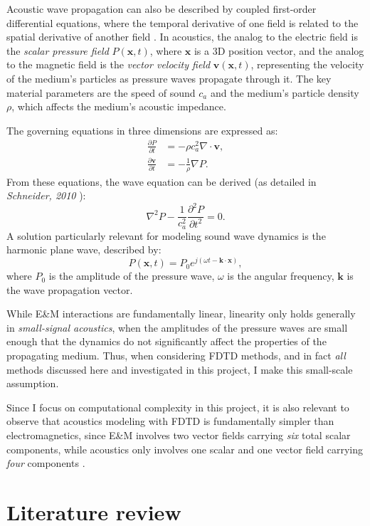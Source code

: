 \documentclass[12pt]{article}
\newcommand{\vct}[1]{\mathbf{#1}}
\begin{document}
Acoustic wave propagation can also be described by coupled first-order differential equations, where the temporal derivative of one field is related to the spatial derivative of another field \cite{schneider_fdtd_2010}.
In acoustics, the analog to the electric field is the \textit{scalar pressure field} $P(\vct{x}, t)$, where $\vct{x}$ is a 3D position vector, and the analog to the magnetic field is the \textit{vector velocity field} $\mathbf{v}(\vct{x}, t)$, representing the velocity of the medium's particles as pressure waves propagate through it.
The key material parameters are the speed of sound $c_a$ and the medium's particle density $\rho$, which affects the medium's acoustic impedance.

The governing equations in three dimensions are expressed as:
\begin{align}
\frac{\partial P}{\partial t} &= -\rho c_a^2 \nabla \cdot \mathbf{v},\\
\frac{\partial \mathbf{v}}{\partial t} &= -\frac{1}{\rho}\nabla P.
\end{align}
From these equations, the wave equation can be derived (as detailed in \textit{Schneider, 2010} \cite{schneider_fdtd_2010}):
$$\nabla^2P - \frac{1}{c_a^2}\frac{\partial^2 P}{\partial t^2} = 0.$$
A solution particularly relevant for modeling sound wave dynamics is the harmonic plane wave, described by:
$$P(\vct{x},t) = P_0 e^{j(\omega t - \vct{k} \cdot \vct{x})},$$
where $P_0$ is the amplitude of the pressure wave, $\omega$ is the angular frequency, $\vct{k}$ is the wave propagation vector.

While E\&M interactions are fundamentally linear, linearity only holds generally in \textit{small-signal acoustics}, when the amplitudes of the pressure waves are small enough that the dynamics do not significantly affect the properties of the propagating medium.
Thus, when considering FDTD methods, and in fact \textit{all} methods discussed here and investigated in this project, I make this small-scale assumption.

Since I focus on computational complexity in this project, it is also relevant to observe that acoustics modeling with FDTD is fundamentally simpler than electromagnetics, since E\&M involves two vector fields carrying \textit{six} total scalar components, while acoustics only involves one scalar and one vector field carrying \textit{four} components \cite{schneider_fdtd_2010}.

\section{Literature review}
\end{document}
